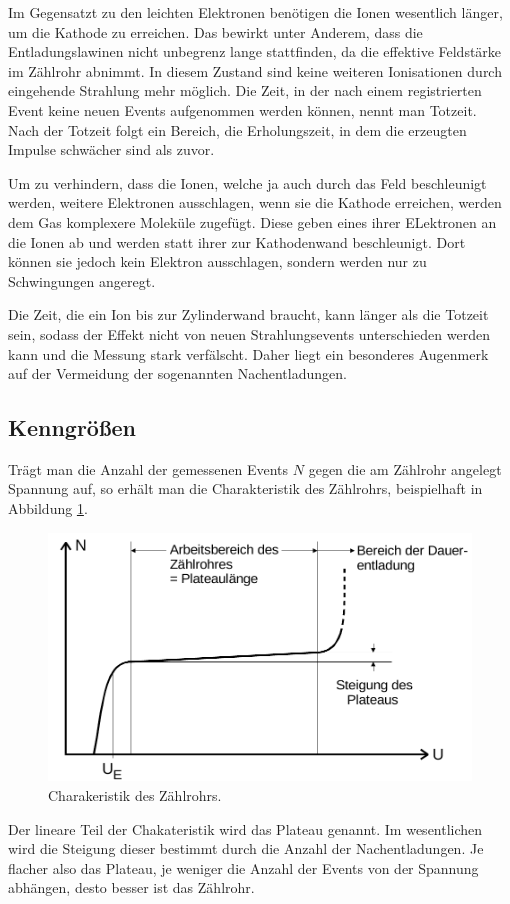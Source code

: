 Im Gegensatzt zu den leichten Elektronen benötigen die Ionen wesentlich länger, um die Kathode zu erreichen. 
Das bewirkt unter Anderem, dass die Entladungslawinen nicht unbegrenz lange stattfinden, da die effektive Feldstärke 
im Zählrohr abnimmt.
In diesem Zustand sind keine weiteren Ionisationen durch eingehende Strahlung mehr möglich.
Die Zeit, in der nach einem registrierten Event keine neuen Events aufgenommen werden können, nennt man Totzeit.
Nach der Totzeit folgt ein Bereich, die Erholungszeit, in dem die erzeugten Impulse schwächer sind als zuvor.

Um zu verhindern, dass die Ionen, welche ja auch durch das Feld beschleunigt werden, weitere Elektronen ausschlagen, 
wenn sie die Kathode erreichen, werden dem Gas komplexere Moleküle zugefügt. Diese geben eines ihrer ELektronen an die Ionen ab 
und werden statt ihrer zur Kathodenwand beschleunigt.
Dort können sie jedoch kein Elektron ausschlagen, sondern werden nur zu Schwingungen angeregt.

Die Zeit, die ein Ion bis zur Zylinderwand braucht, kann länger als die Totzeit sein, sodass der Effekt nicht von neuen 
Strahlungsevents unterschieden werden kann und die Messung stark verfälscht.
Daher liegt ein besonderes Augenmerk auf der Vermeidung der sogenannten Nachentladungen.

\subsection{Kenngrößen}
Trägt man die Anzahl der gemessenen Events $N$ gegen die am Zählrohr angelegt Spannung auf, so erhält man die Charakteristik 
des Zählrohrs, beispielhaft in Abbildung \ref{fig:plateau}.
\begin{figure}[H]
  \centering
  \includegraphics[width=\textwidth]{content/plateau.png}
  \caption{Charakeristik des Zählrohrs.\cite{v703}}
  \label{fig:plateau}
\end{figure}
Der lineare Teil der Chakateristik wird das Plateau genannt.
Im wesentlichen wird die Steigung dieser bestimmt durch die Anzahl der Nachentladungen.
Je flacher also das Plateau, je weniger die Anzahl der Events von der Spannung abhängen, desto besser ist das Zählrohr.

